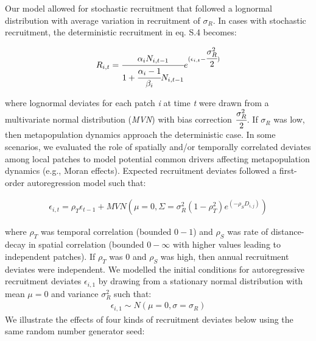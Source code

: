 \documentclass[
]{article}
\begin{document}
Our model allowed for stochastic recruitment that followed a lognormal
distribution with average variation in recruitment of \(\sigma_R\). In
cases with stochastic recruitment, the deterministic recruitment in eq.
S.4 becomes:

\begin{align}
R_{i,t}=\cfrac{\alpha_iN_{i,t-1}}{1+\cfrac{\alpha_i-1}{\beta_i}N_{i,t-1}}e^{(\epsilon_{i,t}-\cfrac{\sigma_{R}^2}{2})}
\end{align}

where lognormal deviates for each patch \emph{i} at time \emph{t} were
drawn from a multivariate normal distribution (\emph{MVN}) with bias
correction \(\cfrac{\sigma_{R}^2}{2}\). If \(\sigma_R\) was low, then
metapopulation dynamics approach the deterministic case. In some
scenarios, we evaluated the role of spatially and/or temporally
correlated deviates among local patches to model potential common
drivers affecting metapopulation dynamics (e.g., Moran effects).
Expected recruitment deviates followed a first-order autoregression
model such that:

\begin{align}
\epsilon_{i,t}=\rho_T\epsilon_{t-1}+MVN(\mu=0,\Sigma=\sigma_R^2(1-\rho_T^2)e^{(-\rho_SD_{i,j})})
\end{align}

where \(\rho_T\) was temporal correlation (bounded \(0-1\)) and
\(\rho_S\) was rate of distance-decay in spatial correlation (bounded
\(0-\infty\) with higher values leading to independent patches). If
\(\rho_T\) was 0 and \(\rho_S\) was high, then annual recruitment
deviates were independent. We modelled the initial conditions for
autoregressive recruitment deviates \(\epsilon_{i,1}\) by drawing from a
stationary normal distribution with mean \(\mu=0\) and variance
\(\sigma_R^2\) such that: \begin{align}
\epsilon_{i,1} \sim N(\mu=0,\sigma=\sigma_R)
\end{align} We illustrate the effects of four kinds of recruitment
deviates below using the same random number generator seed:
\end{document}

